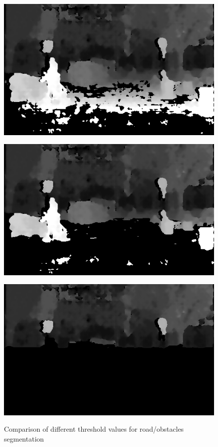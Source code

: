 \documentclass[a4paper,11pt]{article}
\begin{document}
\begin{figure}[H]
\centering
\begin{minipage}{0.32\linewidth}
\includegraphics[scale=0.25]{pic/cartesian-00m.png}
\label{threshold-comparison:a}
\end{minipage}
\begin{minipage}{0.32\linewidth}
\includegraphics[scale=0.25]{pic/cartesian-02m.png}
\label{threshold-comparison:b}
\end{minipage}
\begin{minipage}{0.32\linewidth}
\includegraphics[scale=0.25]{pic/cartesian-20m.png}
\label{threshold-comparison:c}
\end{minipage}
\caption{Comparison of different threshold values for road/obstacles segmentation}
\label{threshold-comparison}
\end{figure}
\end{document}
